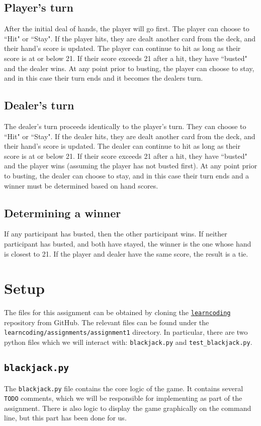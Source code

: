 \documentclass{article}
\begin{document}
\subsection{Player's turn}

After the initial deal of hands, the player will go first. The player can choose to ``Hit" or ``Stay". If the player hits, they are dealt another card from the deck, and their hand's score is updated. The player can continue to hit as long as their score is at or below 21. If their score exceeds 21 after a hit, they have ``busted" and the dealer wins. At any point prior to busting, the player can choose to stay, and in this case their turn ends and it becomes the dealers turn.

\subsection{Dealer's turn}
The dealer's turn proceeds identically to the player's turn. They can choose to ``Hit" or ``Stay". If the dealer hits, they are dealt another card from the deck, and their hand's score is updated. The dealer can continue to hit as long as their score is at or below 21. If their score exceeds 21 after a hit, they have ``busted" and the player wins (assuming the player has not busted first). At any point prior to busting, the dealer can choose to stay, and in this case their turn ends and a winner must be determined based on hand scores.

\subsection{Determining a winner}
If any participant has busted, then the other participant wins. If neither participant has busted, and both have stayed, the winner is the one whose hand is closest to 21. If the player and dealer have the same score, the result is a tie.


\section{Setup} 
The files for this assignment can be obtained by cloning the \texttt{\href{https://github.com/Gordon-C/learncoding}{learncoding}} repository from GitHub. The relevant files can be found under the \texttt{learncoding/assignments/assignment1} directory. In particular, there are two python files which we will interact with: \texttt{blackjack.py} and \texttt{test\_blackjack.py}.

\subsection{\texttt{blackjack.py}}
The \texttt{blackjack.py} file contains the core logic of the game. It contains several \texttt{TODO} comments, which we will be responsible for implementing as part of the assignment. There is also logic to display the game graphically on the command line, but this part has been done for us.
\end{document}
